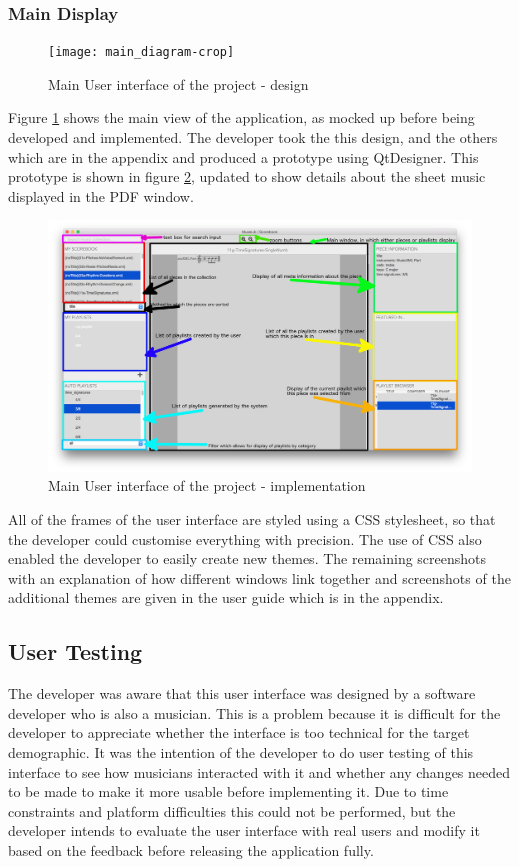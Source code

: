 \subsubsection{Main Display}
\begin{figure}[H]
	\centering
    \texttt{[image: main\_diagram-crop]}
    \caption{Main User interface of the project - design}
    \label{fig:main}
\end{figure}
Figure \ref{fig:main} shows the main view of the application, as mocked up before being developed and implemented. The developer took the this design, and the others which are in the appendix and produced a prototype using QtDesigner. This prototype is shown in figure \ref{fig:annotated}, updated to show details about the sheet music displayed in the PDF window.
\begin{figure}[H]
	\centering
    \includegraphics[width=500pt]{annotated_gui}
    \caption{Main User interface of the project - implementation}
    \label{fig:annotated}
\end{figure}
All of the frames of the user interface are styled using a CSS stylesheet, so that the developer could customise everything with precision. The use of CSS also enabled the developer to easily create new themes. The remaining screenshots with an explanation of how different windows link together and screenshots of the additional themes are given in the user guide which is in the appendix.

\subsection{User Testing}
The developer was aware that this user interface was designed by a software developer who is also a musician. This is a problem because it is difficult for the developer to appreciate whether the interface is too technical for the target demographic. It was the intention of the developer to do user testing of this interface to see how musicians interacted with it and whether any changes needed to be made to make it more usable before implementing it. Due to time constraints and platform difficulties this could not be performed, but the developer intends to evaluate the user interface with real users and modify it based on the feedback before releasing the application fully.

